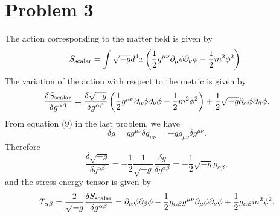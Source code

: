 \documentclass{article}
\begin{document}
\section*{Problem 3}
The action corresponding to the matter field is given by
\begin{equation}
    S_{\rm scalar} = \int \sqrt{-g} d^4x \left(
        \frac{1}{2} g^{\mu \nu} \partial_\mu \phi \partial_\nu \phi
        -\frac{1}{2}m^2\phi^2
    \right).
\end{equation}
The variation of the action with respect to the metric is given by
\begin{equation}
    \frac{\delta S_{\rm scalar}}{\delta g^{\alpha \beta}}
    = \frac{\delta \sqrt{-g}}{\delta g^{\alpha \beta}} 
    \left(\frac{1}{2}g^{\mu \nu} \partial_\mu \phi \partial_\nu \phi
    -\frac{1}{2} m^2\phi^2\right)
    +\frac{1}{2}\sqrt{-g}\partial_\alpha \phi \partial_\beta \phi.
\end{equation}
From equation (9) in the last problem, we have
\begin{equation}
    \delta g = g g^{\mu \nu} \delta g_{\mu \nu} = - g g_{\mu \nu}\delta g^{\mu \nu}.
\end{equation}
Therefore 
\begin{equation}
    \frac{\delta \sqrt{-g}}{\delta g^{\alpha \beta}}
    = -\frac{1}{2} \frac{1}{\sqrt{-g}} \frac{\delta g}{\delta g^{\alpha \beta}}
    = -\frac{1}{2} \sqrt{-g} g_{\alpha \beta},
\end{equation}
and the stress energy tensor is given by
\begin{equation}
   T_{\alpha \beta}=\frac{2}{\sqrt{-g}} \frac{\delta S_{\rm scalar}}{\delta g^{\alpha \beta}}
   = \partial_\alpha \phi \partial_\beta \phi 
   - \frac{1}{2} g_{\alpha \beta} g^{\mu \nu} \partial_\mu \phi \partial_\nu \phi
   + \frac{1}{2} g_{\alpha \beta} m^2 \phi^2.
\end{equation}
\end{document}
